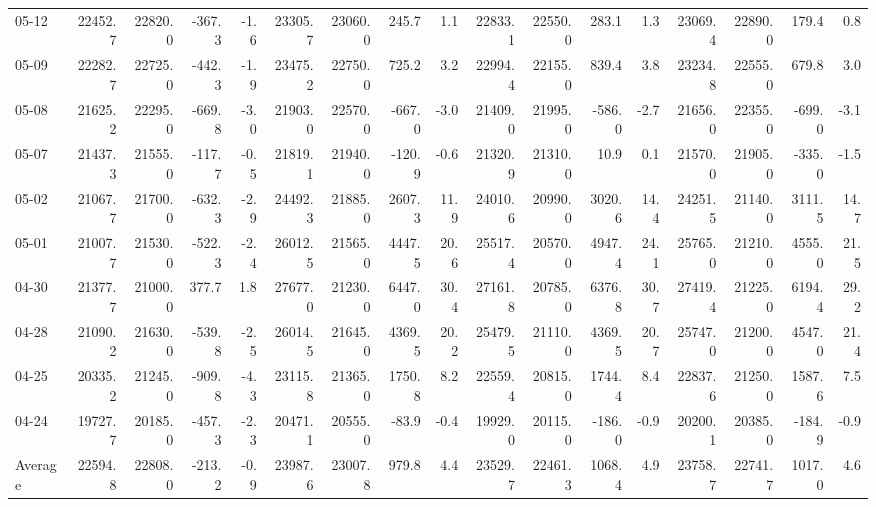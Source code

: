 \begin{threeparttable}
{\begin{tabular}{lrrrrrrrrrrrrrrrr}
  05-12 & 22452.7 & 22820.0 &     -367.3 &           -1.6 & 23305.7 & 23060.0 &      245.7 &            1.1 & 22833.1 & 22550.0 &      283.1 &            1.3 & 23069.4 & 22890.0 &       179.4 &              0.8 \\
  05-09 & 22282.7 & 22725.0 &     -442.3 &           -1.9 & 23475.2 & 22750.0 &      725.2 &            3.2 & 22994.4 & 22155.0 &      839.4 &            3.8 & 23234.8 & 22555.0 &       679.8 &              3.0 \\
  05-08 & 21625.2 & 22295.0 &     -669.8 &           -3.0 & 21903.0 & 22570.0 &     -667.0 &           -3.0 & 21409.0 & 21995.0 &     -586.0 &           -2.7 & 21656.0 & 22355.0 &      -699.0 &             -3.1 \\
  05-07 & 21437.3 & 21555.0 &     -117.7 &           -0.5 & 21819.1 & 21940.0 &     -120.9 &           -0.6 & 21320.9 & 21310.0 &       10.9 &            0.1 & 21570.0 & 21905.0 &      -335.0 &             -1.5 \\
  05-02 & 21067.7 & 21700.0 &     -632.3 &           -2.9 & 24492.3 & 21885.0 &     2607.3 &           11.9 & 24010.6 & 20990.0 &     3020.6 &           14.4 & 24251.5 & 21140.0 &      3111.5 &             14.7 \\
  05-01 & 21007.7 & 21530.0 &     -522.3 &           -2.4 & 26012.5 & 21565.0 &     4447.5 &           20.6 & 25517.4 & 20570.0 &     4947.4 &           24.1 & 25765.0 & 21210.0 &      4555.0 &             21.5 \\
  04-30 & 21377.7 & 21000.0 &      377.7 &            1.8 & 27677.0 & 21230.0 &     6447.0 &           30.4 & 27161.8 & 20785.0 &     6376.8 &           30.7 & 27419.4 & 21225.0 &      6194.4 &             29.2 \\
  04-28 & 21090.2 & 21630.0 &     -539.8 &           -2.5 & 26014.5 & 21645.0 &     4369.5 &           20.2 & 25479.5 & 21110.0 &     4369.5 &           20.7 & 25747.0 & 21200.0 &      4547.0 &             21.4 \\
  04-25 & 20335.2 & 21245.0 &     -909.8 &           -4.3 & 23115.8 & 21365.0 &     1750.8 &            8.2 & 22559.4 & 20815.0 &     1744.4 &            8.4 & 22837.6 & 21250.0 &      1587.6 &              7.5 \\
  04-24 & 19727.7 & 20185.0 &     -457.3 &           -2.3 & 20471.1 & 20555.0 &      -83.9 &           -0.4 & 19929.0 & 20115.0 &     -186.0 &           -0.9 & 20200.1 & 20385.0 &      -184.9 &             -0.9 \\
Average & 22594.8 & 22808.0 &     -213.2 &           -0.9 & 23987.6 & 23007.8 &      979.8 &            4.4 & 23529.7 & 22461.3 &     1068.4 &            4.9 & 23758.7 & 22741.7 &      1017.0 &              4.6 \\

\end{tabular}}
\end{threeparttable}
